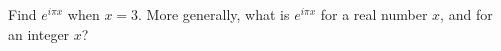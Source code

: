 Find $e^{i\pi x}$ when $x=3$. More generally, what is $e^{i\pi x}$ for a real number $x$, and for an integer $x$?
